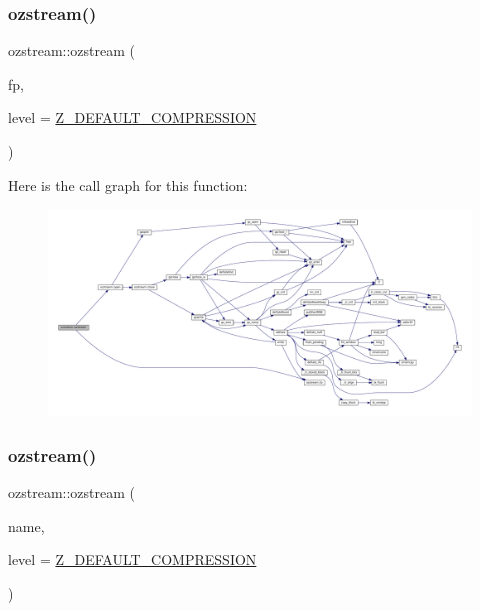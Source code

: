 \subsubsection{\texorpdfstring{ozstream()}{ozstream()}\hspace{0.1cm}{\footnotesize\ttfamily [2/3]}}
{\footnotesize\ttfamily ozstream\+::ozstream (\begin{DoxyParamCaption}\item[{F\+I\+LE $\ast$}]{fp,  }\item[{\mbox{\hyperlink{ioapi_8h_a787fa3cf048117ba7123753c1e74fcd6}{int}}}]{level = {\ttfamily \mbox{\hyperlink{zlib_8h_af5387baee05124298e431ebe6fe96b17}{Z\+\_\+\+D\+E\+F\+A\+U\+L\+T\+\_\+\+C\+O\+M\+P\+R\+E\+S\+S\+I\+ON}}} }\end{DoxyParamCaption})\hspace{0.3cm}{\ttfamily [inline]}}

Here is the call graph for this function\+:
\nopagebreak
\begin{figure}[H]
\begin{center}
\leavevmode
\includegraphics[width=350pt]{classozstream_add8c121cdb4538f9f2de2d517c640e61_cgraph}
\end{center}
\end{figure}
\mbox{\label{classozstream_af30abfcf07fef0000c7fd3e4ab89eb85}} 
\subsubsection{\texorpdfstring{ozstream()}{ozstream()}\hspace{0.1cm}{\footnotesize\ttfamily [3/3]}}
{\footnotesize\ttfamily ozstream\+::ozstream (\begin{DoxyParamCaption}\item[{const char $\ast$}]{name,  }\item[{\mbox{\hyperlink{ioapi_8h_a787fa3cf048117ba7123753c1e74fcd6}{int}}}]{level = {\ttfamily \mbox{\hyperlink{zlib_8h_af5387baee05124298e431ebe6fe96b17}{Z\+\_\+\+D\+E\+F\+A\+U\+L\+T\+\_\+\+C\+O\+M\+P\+R\+E\+S\+S\+I\+ON}}} }\end{DoxyParamCaption})\hspace{0.3cm}{\ttfamily [inline]}}

